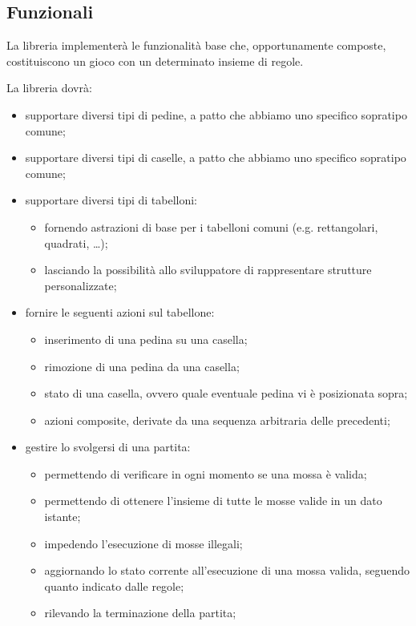 \subsection{Funzionali}

La libreria implementerà le funzionalità base che, opportunamente composte, costituiscono un gioco con un determinato insieme di regole.

La libreria dovrà:
%
\begin{itemize}
    \item supportare diversi tipi di pedine, a patto che abbiamo uno specifico sopratipo comune;
    \item supportare diversi tipi di caselle, a patto che abbiamo uno specifico sopratipo comune;
    \item supportare diversi tipi di tabelloni:
    \begin{itemize}
        \item fornendo astrazioni di base per i tabelloni comuni (e.g. rettangolari, quadrati, \dots);
        \item lasciando la possibilità allo sviluppatore di rappresentare strutture personalizzate;
    \end{itemize}
    \item fornire le seguenti azioni sul tabellone:
    \begin{itemize}
        \item inserimento di una pedina su una casella;
        \item rimozione di una pedina da una casella;
        \item stato di una casella, ovvero quale eventuale pedina vi è posizionata sopra;
        \item azioni composite, derivate da una sequenza arbitraria delle precedenti;
    \end{itemize}
    \item gestire lo svolgersi di una partita:
    \begin{itemize}
        \item permettendo di verificare in ogni momento se una mossa è valida;
        \item permettendo di ottenere l'insieme di tutte le mosse valide in un dato istante; 
        \item impedendo l'esecuzione di mosse illegali;
        \item aggiornando lo stato corrente all'esecuzione di una mossa valida, seguendo quanto indicato dalle regole;
        \item rilevando la terminazione della partita;

\end{itemize}
\end{itemize}
